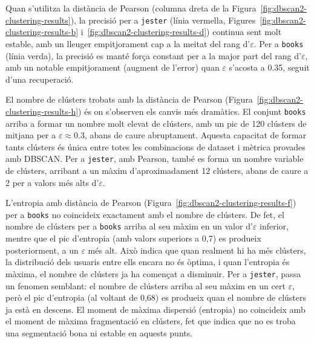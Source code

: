 \documentclass[a4paper,12pt]{report}
\begin{document}
Quan s'utilitza la distància de Pearson (columna dreta de la Figura~\ref{fig:dbscan2-clustering-results}), la precisió per a \texttt{jester} (línia vermella, Figures~\ref{fig:dbscan2-clustering-results-b} i~\ref{fig:dbscan2-clustering-results-d}) continua sent molt estable, amb un lleuger empitjorament cap a la meitat del rang d'\(\varepsilon\). Per a \texttt{books} (línia verda), la precisió es manté força constant per a la major part del rang d'\(\varepsilon\), amb un notable empitjorament (augment de l'error) quan \(\varepsilon\) s'acosta a 0.35, seguit d'una recuperació.

El nombre de clústers trobats amb la distància de Pearson (Figura~\ref{fig:dbscan2-clustering-results-h}) és on s'observen els canvis més dramàtics. El conjunt \texttt{books} arriba a formar un nombre molt elevat de clústers, amb un pic de 120 clústers de mitjana per a \(\varepsilon \approx 0.3\), abans de caure abruptament. Aquesta capacitat de formar tants clústers és única entre totes les combinacions de dataset i mètrica provades amb DBSCAN. Per a \texttt{jester}, amb Pearson, també es forma un nombre variable de clústers, arribant a un màxim d'aproximadament 12 clústers, abans de caure a 2 per a valors més alts d'\(\varepsilon\).

L’entropia amb distància de Pearson (Figura~\ref{fig:dbscan2-clustering-results-f}) per a \texttt{books} no coincideix exactament amb el nombre de clústers. De fet, el nombre de clústers per a \texttt{books} arriba al seu màxim en un valor d’\(\varepsilon\) inferior, mentre que el pic d’entropia (amb valors superiors a 0,7) es produeix posteriorment, a un \(\varepsilon\) més alt. Això indica que quan realment hi ha més clústers, la distribució dels usuaris entre ells encara no és òptima, i quan l’entropia és màxima, el nombre de clústers ja ha començat a disminuir. Per a \texttt{jester}, passa un fenomen semblant: el nombre de clústers arriba al seu màxim en un cert \(\varepsilon\), però el pic d’entropia (al voltant de 0,68) es produeix quan el nombre de clústers ja està en descens. El moment de màxima dispersió (entropia) no coincideix amb el moment de màxima fragmentació en clústers, fet que indica que no es troba una segmentació bona ni estable en aquests punts.
\end{document}
